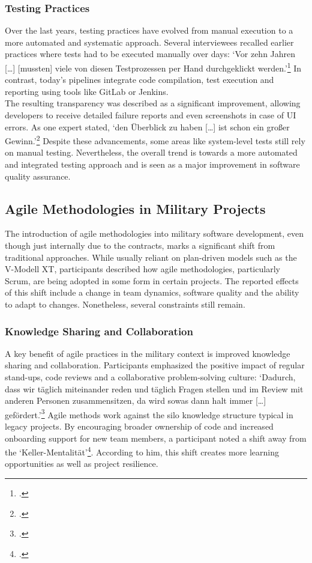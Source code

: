 \subsubsection{Testing Practices}
Over the last years, testing practices have evolved from manual execution to a more automated and systematic approach. Several interviewees recalled earlier practices where tests had to be executed manually over days: `Vor zehn Jahren [\ldots] [mussten] viele von diesen Testprozessen per Hand durchgeklickt werden.'\footcite{Interview22025} In contrast, today's pipelines
integrate code compilation, test execution and reporting using tools like GitLab or Jenkins.\\
The resulting transparency was described as a significant improvement, allowing developers to receive detailed failure reports and even screenshots in case of \ac{UI} errors. As one expert stated, `den Überblick zu haben [\ldots] ist schon ein großer Gewinn.'\footcite{Interview12025}
Despite these advancements, some areas like system-level tests still rely on manual testing. Nevertheless, the overall trend is towards a more automated and integrated testing approach and is seen as a major improvement in software quality assurance.\\

\subsection{Agile Methodologies in Military Projects}
The introduction of agile methodologies into military software development, even though just internally due to the contracts, marks a significant shift from traditional approaches. While usually reliant on plan-driven models such as the V-Modell XT, participants described how agile methodologies, particularly Scrum, are being adopted in some form in certain projects.
The reported effects of this shift include a change in team dynamics, software quality and the ability to adapt to changes. Nonetheless, several constraints still remain.

\subsubsection{Knowledge Sharing and Collaboration}
A key benefit of agile practices in the military context is improved knowledge sharing and collaboration. Participants emphasized the positive impact of regular stand-ups, code reviews and a collaborative problem-solving culture: `Dadurch, dass wir täglich miteinander reden und täglich Fragen stellen und im Review mit anderen 
Personen zusammensitzen, da wird sowas dann halt immer [\ldots] gefördert.'\footcite{Interview32025} Agile methods work against the silo knowledge structure typical in legacy projects. By encouraging broader ownership of code and increased onboarding support for new team members, a participant noted a shift away from the `Keller-Mentalität'\footcite{Interview22025}. According to him,
this shift creates more learning opportunities as well as project resilience.\\

